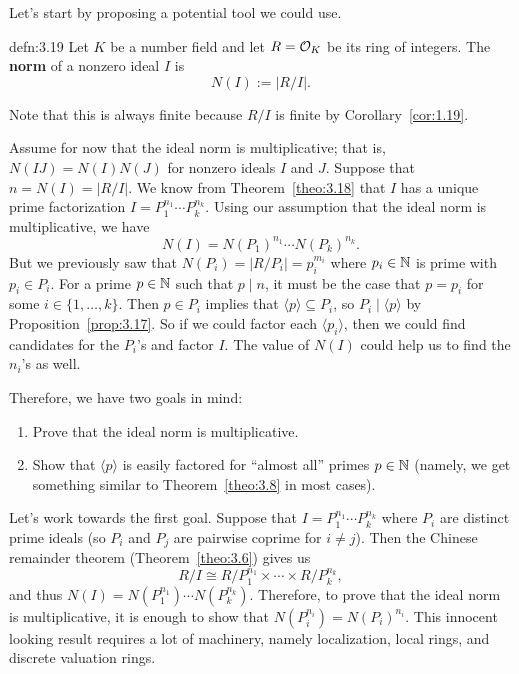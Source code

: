 Let's start by proposing a potential tool we could use. 

\begin{defn}{defn:3.19}
    Let $K$ be a number field and let $R = {\cal O}_K$ be its ring of integers. 
    The {\bf norm} of a nonzero ideal $I$ is 
    \[ N(I) := |R/I|. \] 
\end{defn}\vspace{-0.25cm}
Note that this is always finite because $R/I$ is finite by Corollary~\ref{cor:1.19}.

Assume for now that the ideal norm is multiplicative; that is, 
$N(IJ) = N(I)N(J)$ for nonzero ideals $I$ and $J$. Suppose that 
$n = N(I) = |R/I|$. We know from Theorem~\ref{theo:3.18} that $I$ has a 
unique prime factorization $I = P_1^{n_1} \cdots P_k^{n_k}$. Using our
assumption that the ideal norm is multiplicative, we have 
\[ N(I) = N(P_1)^{n_1} \cdots N(P_k)^{n_k}. \] 
But we previously saw that $N(P_i) = |R/P_i| = p_i^{m_i}$ where 
$p_i \in \mathbb{N}$ is prime with $p_i \in P_i$. For a prime $p \in \mathbb{N}$ 
such that $p \mid n$, it must be the case that $p = p_i$ for some $i \in 
\{1, \dots, k\}$. Then $p \in P_i$ implies that $\langle p \rangle 
\subseteq P_i$, so $P_i \mid \langle p \rangle$ by Proposition~\ref{prop:3.17}.
So if we could factor each $\langle p_i \rangle$, then we could find 
candidates for the $P_i$'s and factor $I$. The value of $N(I)$ could 
help us to find the $n_i$'s as well. 

Therefore, we have two goals in mind: 
\begin{enumerate}[(1)]
    \item Prove that the ideal norm is multiplicative.
    \item Show that $\langle p \rangle$ is easily factored for ``almost all''
    primes $p \in \mathbb{N}$ (namely, we get something similar to 
    Theorem~\ref{theo:3.8} in most cases).
\end{enumerate}
Let's work towards the first goal. Suppose that $I = P_1^{n_1} \cdots P_k^{n_k}$
where $P_i$ are distinct prime ideals (so $P_i$ and $P_j$ are pairwise coprime
for $i \neq j$). Then the Chinese remainder theorem (Theorem~\ref{theo:3.6})
gives us 
\[ R/I \cong R/P_1^{n_1} \times \cdots \times R/P_k^{n_k}, \] 
and thus $N(I) = N(P_1^{n_1}) \cdots N(P_k^{n_k})$. Therefore, to 
prove that the ideal norm is multiplicative, it is enough to show that 
$N(P_i^{n_i}) = N(P_i)^{n_i}$. This innocent looking result requires a 
lot of machinery, namely localization, local rings, and discrete valuation rings.

